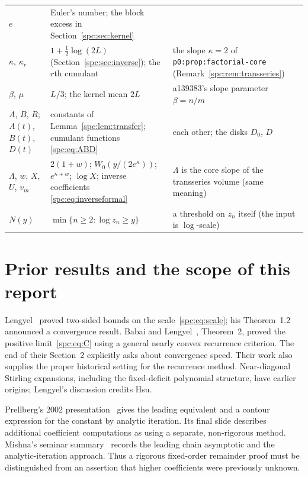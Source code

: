 \documentclass[11pt,letterpaper]{article}
\theoremstyle{definition}\newtheorem{definition}[theorem]{Definition}
\theoremstyle{remark}\newtheorem{remark}[theorem]{Remark}
\newcommand{\file}[1]{\nolinkurl{#1}}
\begin{document}
\begin{minipage}{\textwidth}
\begin{tabular}{@{}>{\raggedright\arraybackslash}p{0.8in}>{\raggedright\arraybackslash}p{3.4in}>{\raggedright\arraybackslash}p{1.95in}@{}}
$e$ & Euler's number; the block excess in Section~\ref{spc:sec:kernel} &\\
$\kappa$, $\kappa_r$ & $1+\tfrac12\log(2L)$ (Section~\ref{spc:sec:inverse});
 the $r$th cumulant & the slope $\kappa=2$ of \file{p0:prop:factorial-core}
 (Remark~\ref{spc:rem:transseries})\\
$\beta$, $\mu$ & $L/3$; the kernel mean $2L$ & a139383's slope parameter
 $\beta=n/m$\\
$A$, $B$, $R$; $A(t)$, $B(t)$, $D(t)$ & constants of Lemma~\ref{spc:lem:transfer};
 cumulant functions \eqref{spc:eq:ABD} & each other; the disks $D_0$, $D$\\
$\Lambda$, $w$, $X$, $U$, $v_m$ & $2(1+w)$; $W_0(y/(2e^\kappa))$; $e^{\kappa+w}$;
 $\log X$; inverse coefficients \eqref{spc:eq:inverseformal} & $\Lambda$ is
 the core slope of the transseries volume (same meaning)\\
$N(y)$ & $\min\{n\ge2:\log z_n\ge y\}$ & a threshold on $z_n$ itself (the
 input is $\log$-scale)\\
\bottomrule
\end{tabular}
\endgroup
\end{minipage}

\section{Prior results and the scope of this report}\label{spc:sec:prior}
Lengyel~\cite{Lengyel} proved two-sided bounds on the scale~\eqref{spc:eq:scale}; his Theorem~1.2 announced a convergence result. Babai and Lengyel~\cite{BabaiLengyel}, Theorem~2, proved the positive limit~\eqref{spc:eq:C} using a general nearly convex recurrence criterion. The end of their Section~2 explicitly asks about convergence speed. Their work also supplies the proper historical setting for the recurrence method. Near-diagonal Stirling expansions, including the fixed-deficit polynomial structure, have earlier origins; Lengyel's discussion credits Hsu.

Prellberg's 2002 presentation~\cite{Prellberg} gives the leading equivalent and a contour expression for the constant by analytic iteration. Its final slide describes additional coefficient computations as using a separate, non-rigorous method. Mishna's seminar summary~\cite{Mishna} records the leading chain asymptotic and the analytic-iteration approach. Thus a rigorous fixed-order remainder proof must be distinguished from an assertion that higher coefficients were previously unknown.
\end{document}
